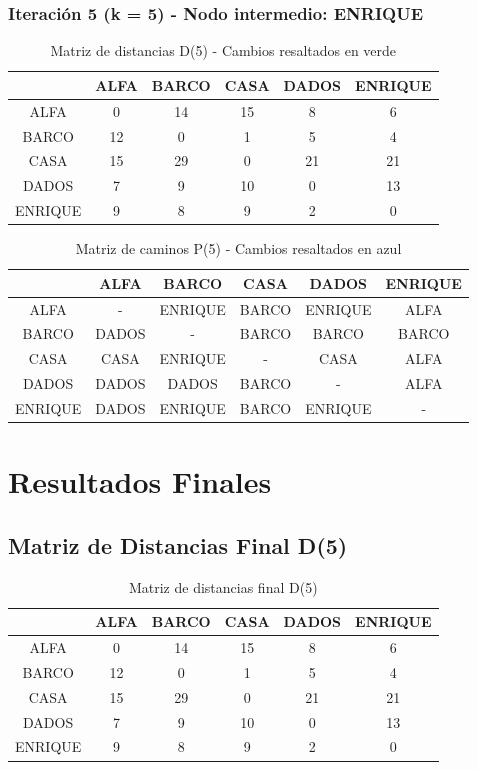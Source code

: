 \documentclass[12pt]{article}
\begin{document}
\subsubsection{Iteración 5 (k = 5) - Nodo intermedio: ENRIQUE}
\begin{table}[h!]
\centering
\begin{tabular}{|c|c|c|c|c|c|}
\hline
 & ALFA & BARCO & CASA & DADOS & ENRIQUE \\\hline
ALFA & 0 & \cellcolor{lightgreen} 14 & \cellcolor{lightgreen} 15 & \cellcolor{lightgreen} 8 & 6 \\\hline
BARCO & 12 & 0 & 1 & 5 & 4 \\\hline
CASA & 15 & \cellcolor{lightgreen} 29 & 0 & 21 & 21 \\\hline
DADOS & 7 & 9 & 10 & 0 & 13 \\\hline
ENRIQUE & 9 & 8 & 9 & 2 & 0 \\\hline
\end{tabular}
\caption{Matriz de distancias D(5) - Cambios resaltados en verde}
\end{table}

\begin{table}[h!]
\centering
\begin{tabular}{|c|c|c|c|c|c|}
\hline
 & ALFA & BARCO & CASA & DADOS & ENRIQUE \\\hline
ALFA & - & \cellcolor{lightblue} ENRIQUE & \cellcolor{lightblue} BARCO & \cellcolor{lightblue} ENRIQUE & ALFA \\\hline
BARCO & DADOS & - & BARCO & BARCO & BARCO \\\hline
CASA & CASA & \cellcolor{lightblue} ENRIQUE & - & CASA & ALFA \\\hline
DADOS & DADOS & DADOS & BARCO & - & ALFA \\\hline
ENRIQUE & DADOS & ENRIQUE & BARCO & ENRIQUE & - \\\hline
\end{tabular}
\caption{Matriz de caminos P(5) - Cambios resaltados en azul}
\end{table}

\clearpage
\section{Resultados Finales}
\subsection{Matriz de Distancias Final D(5)}
\begin{table}[h!]
\centering
\begin{tabular}{|c|c|c|c|c|c|}
\hline
 & ALFA & BARCO & CASA & DADOS & ENRIQUE \\\hline
ALFA & 0 & 14 & 15 & 8 & 6 \\\hline
BARCO & 12 & 0 & 1 & 5 & 4 \\\hline
CASA & 15 & 29 & 0 & 21 & 21 \\\hline
DADOS & 7 & 9 & 10 & 0 & 13 \\\hline
ENRIQUE & 9 & 8 & 9 & 2 & 0 \\\hline
\end{tabular}
\caption{Matriz de distancias final D(5)}
\end{table}
\end{document}
